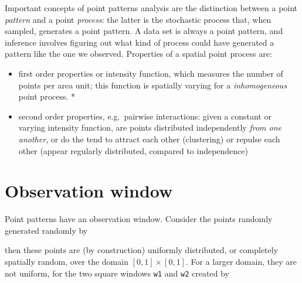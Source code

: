 \documentclass[]{book}
\newenvironment{Shaded}{\begin{snugshade}}{\end{snugshade}}
\newcommand{\DataTypeTok}[1]{\textcolor[rgb]{0.13,0.29,0.53}{#1}}
\newcommand{\DecValTok}[1]{\textcolor[rgb]{0.00,0.00,0.81}{#1}}
\newcommand{\KeywordTok}[1]{\textcolor[rgb]{0.13,0.29,0.53}{\textbf{#1}}}
\newcommand{\NormalTok}[1]{#1}
\newcommand{\OperatorTok}[1]{\textcolor[rgb]{0.81,0.36,0.00}{\textbf{#1}}}
\newcommand{\StringTok}[1]{\textcolor[rgb]{0.31,0.60,0.02}{#1}}
\providecommand{\tightlist}{%
  \setlength{\itemsep}{0pt}\setlength{\parskip}{0pt}}
\begin{document}
Important concepts of point patterns analysis are the distinction
between a point \emph{pattern} and a point \emph{process}: the latter is the
stochastic process that, when sampled, generates a point pattern.
A data set is always a point pattern, and inference involves figuring
out what kind of process could have generated a pattern like the one
we observed. Properties of a spatial point process are:

\begin{itemize}
\tightlist
\item
  first order properties or intensity function, which measures the
  number of points per area unit; this function is spatially varying
  for a \emph{inhomogeneous} point process. *
\item
  second order properties, e.g.~pairwise interactions: given a
  constant or varying intensity function, are points distributed
  independently \emph{from one another}, or do the tend to attract
  each other (clustering) or repulse each other (appear regularly
  distributed, compared to independence)
\end{itemize}

\hypertarget{observation-window}{%
\section{Observation window}\label{observation-window}}

Point patterns have an observation window. Consider the points
randomly generated randomly by

\begin{Shaded}
\end{Shaded}

then these points are (by construction) uniformly distributed,
or completely spatially random, over the domain \([0,1] \times [0,1]\). For
a larger domain, they are not uniform, for the two square windows
\texttt{w1} and \texttt{w2} created by
\end{document}
